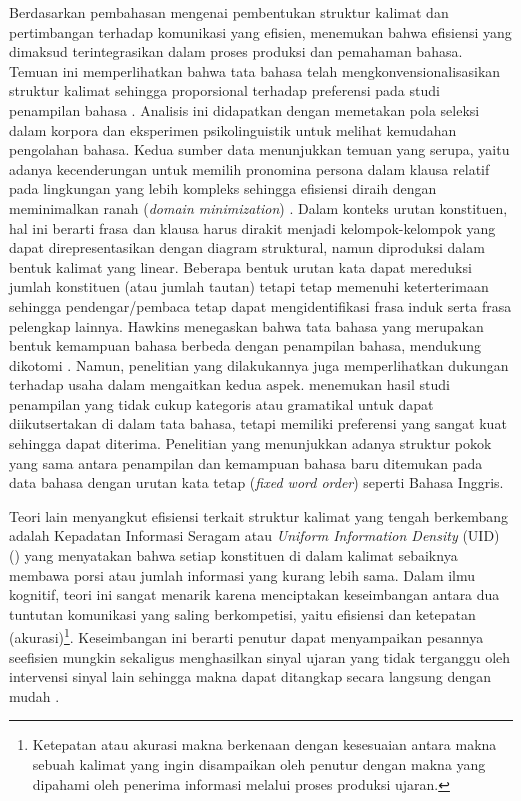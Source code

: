 Berdasarkan pembahasan mengenai pembentukan struktur kalimat dan pertimbangan terhadap komunikasi yang efisien, \cite{hawkins2004efficiency} menemukan bahwa efisiensi yang dimaksud terintegrasikan dalam proses produksi dan pemahaman bahasa. Temuan ini memperlihatkan bahwa tata bahasa telah mengkonvensionalisasikan struktur kalimat sehingga proporsional terhadap preferensi pada studi penampilan bahasa \citep{hawkins2004efficiency}. Analisis ini didapatkan dengan memetakan pola seleksi dalam korpora dan eksperimen psikolinguistik untuk melihat kemudahan pengolahan bahasa. Kedua sumber data menunjukkan temuan yang serupa, yaitu adanya kecenderungan untuk memilih pronomina persona dalam klausa relatif pada lingkungan yang lebih kompleks sehingga efisiensi diraih dengan meminimalkan ranah (\textit{domain minimization}) \citep{hawkins2004efficiency}. Dalam konteks urutan konstituen, hal ini berarti frasa dan klausa harus dirakit menjadi kelompok-kelompok yang dapat direpresentasikan dengan diagram struktural, namun diproduksi dalam bentuk kalimat yang linear. Beberapa bentuk urutan kata dapat mereduksi jumlah konstituen (atau jumlah tautan) tetapi tetap memenuhi keterterimaan sehingga pendengar/pembaca tetap dapat mengidentifikasi frasa induk serta frasa pelengkap lainnya. Hawkins menegaskan bahwa tata bahasa yang merupakan bentuk kemampuan bahasa berbeda dengan penampilan bahasa, mendukung dikotomi \cite{chomsky1965syntactic}. Namun, penelitian yang dilakukannya juga memperlihatkan dukungan terhadap usaha dalam mengaitkan kedua aspek. \cite{hawkins2004efficiency} menemukan hasil studi penampilan yang tidak cukup kategoris atau gramatikal untuk dapat diikutsertakan di dalam tata bahasa, tetapi memiliki preferensi yang sangat kuat sehingga dapat diterima. Penelitian \cite{hawkins2004efficiency} yang menunjukkan adanya struktur pokok yang sama antara penampilan dan kemampuan bahasa baru ditemukan pada data bahasa dengan urutan kata tetap (\textit{fixed word order}) seperti Bahasa Inggris. 

Teori lain menyangkut efisiensi terkait struktur kalimat yang tengah berkembang adalah Kepadatan Informasi Seragam atau \textit{Uniform Information Density} (UID) (\citealp{jaeger2007speakers, frank2008speaking}) yang menyatakan bahwa setiap konstituen di dalam kalimat sebaiknya membawa porsi atau jumlah informasi yang kurang lebih sama. Dalam ilmu kognitif, teori ini sangat menarik karena menciptakan keseimbangan antara dua tuntutan komunikasi yang saling berkompetisi, yaitu efisiensi dan ketepatan (akurasi)\footnote{Ketepatan atau akurasi makna berkenaan dengan kesesuaian antara makna sebuah kalimat yang ingin disampaikan oleh penutur dengan makna yang dipahami oleh penerima informasi melalui proses produksi ujaran.}. Keseimbangan ini berarti penutur dapat menyampaikan pesannya seefisien mungkin sekaligus menghasilkan sinyal ujaran yang tidak terganggu oleh intervensi sinyal lain sehingga makna dapat ditangkap secara langsung dengan mudah \citep{jaeger2007speakers}.

